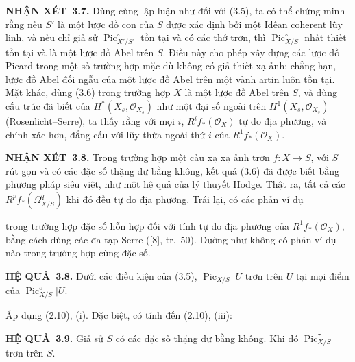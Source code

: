 \documentclass[11pt,twoside,openany]{book}
\numberwithin{equation}{section}
\newcommand{\src}[1]{%
  \phantomsection\hypertarget{src:\fgasourceid:#1}{}%
  \marginpar{\raggedleft\footnotesize\sffamily #1}%
}
\newcommand{\fgasourceid}{unset}
\newcommand{\result}[2]{\par\medskip\noindent\textbf{#1\if\relax\detokenize{#2}\relax\else\ #2\fi.}\quad}
\begin{document}
\result{NHẬN XÉT}{3.7} Dùng cùng lập luận như đối với (3.5), ta có thể chứng
minh rằng nếu $S'$ là một lược đồ con của $S$ được xác định bởi một Iđêan
coherent lũy linh, và nếu chỉ giả sử $\operatorname{Pic}_{X'/S'}^\circ$ tồn
tại và có các thớ trơn, thì $\operatorname{Pic}_{X/S}^\circ$ nhất thiết tồn
tại và là một lược đồ Abel trên $S$. Điều này cho phép xây dựng các lược đồ
Picard trong một số trường hợp mặc dù không có giả thiết xạ ảnh; chẳng hạn,
lược đồ Abel đối ngẫu của một lược đồ Abel trên một vành artin luôn tồn tại.
Mặt khác, dùng (3.6) trong trường hợp $X$ là một lược đồ Abel trên $S$, và dùng
cấu trúc đã biết của $H^*(X_s,\mathcal O_{X_s})$ như một đại số ngoài trên
$H^1(X_s,\mathcal O_{X_s})$ (Rosenlicht--Serre), ta thấy rằng với mọi $i$,
$R^if_*(\mathcal O_X)$ tự do địa phương, và chính xác hơn, đẳng cấu với lũy
thừa ngoài thứ $i$ của $R^1f_*(\mathcal O_X)$.

\result{NHẬN XÉT}{3.8} Trong trường hợp một cấu xạ xạ ảnh trơn
$f:X\longrightarrow S$, với $S$ rút gọn và có các đặc số thặng dư bằng không,
kết quả (3.6) đã được biết bằng phương pháp siêu việt, như một hệ quả của lý
thuyết Hodge. Thật ra, tất cả các $R^pf_*(\Omega^q_{X/S})$ khi đó đều tự do
địa phương. Trái lại, có các phản ví dụ
\src{241}
trong trường hợp đặc số hỗn hợp đối với tính tự do địa phương của
$R^1f_*(\mathcal O_X)$, bằng cách dùng các đa tạp Serre ([8], tr.~50). Dường
như không có phản ví dụ nào trong trường hợp cùng đặc số.

\result{HỆ QUẢ}{3.8} Dưới các điều kiện của (3.5),
$\operatorname{Pic}_{X/S}|U$ trơn trên $U$ tại mọi điểm của
$\operatorname{Pic}_{X/S}^\sigma|U$.

Áp dụng (2.10), (i). Đặc biệt, có tính đến (2.10), (iii):

\result{HỆ QUẢ}{3.9} Giả sử $S$ có các đặc số thặng dư bằng không. Khi đó
$\operatorname{Pic}_{X/S}^\tau$ trơn trên $S$.
\end{document}
